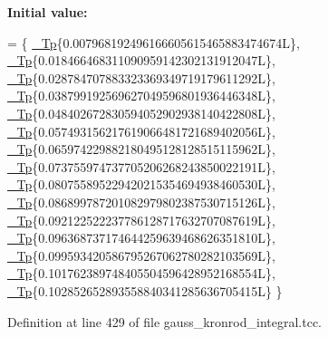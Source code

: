 {\bfseries Initial value\+:}
\begin{DoxyCode}
=
      \{
        \hyperlink{namespace____gnu__cxx_a3b19a9c800ca194374ef9172290f7d79}{\_Tp}\{0.007968192496166605615465883474674L\},
        \hyperlink{namespace____gnu__cxx_a3b19a9c800ca194374ef9172290f7d79}{\_Tp}\{0.018466468311090959142302131912047L\},
        \hyperlink{namespace____gnu__cxx_a3b19a9c800ca194374ef9172290f7d79}{\_Tp}\{0.028784707883323369349719179611292L\},
        \hyperlink{namespace____gnu__cxx_a3b19a9c800ca194374ef9172290f7d79}{\_Tp}\{0.038799192569627049596801936446348L\},
        \hyperlink{namespace____gnu__cxx_a3b19a9c800ca194374ef9172290f7d79}{\_Tp}\{0.048402672830594052902938140422808L\},
        \hyperlink{namespace____gnu__cxx_a3b19a9c800ca194374ef9172290f7d79}{\_Tp}\{0.057493156217619066481721689402056L\},
        \hyperlink{namespace____gnu__cxx_a3b19a9c800ca194374ef9172290f7d79}{\_Tp}\{0.065974229882180495128128515115962L\},
        \hyperlink{namespace____gnu__cxx_a3b19a9c800ca194374ef9172290f7d79}{\_Tp}\{0.073755974737705206268243850022191L\},
        \hyperlink{namespace____gnu__cxx_a3b19a9c800ca194374ef9172290f7d79}{\_Tp}\{0.080755895229420215354694938460530L\},
        \hyperlink{namespace____gnu__cxx_a3b19a9c800ca194374ef9172290f7d79}{\_Tp}\{0.086899787201082979802387530715126L\},
        \hyperlink{namespace____gnu__cxx_a3b19a9c800ca194374ef9172290f7d79}{\_Tp}\{0.092122522237786128717632707087619L\},
        \hyperlink{namespace____gnu__cxx_a3b19a9c800ca194374ef9172290f7d79}{\_Tp}\{0.096368737174644259639468626351810L\},
        \hyperlink{namespace____gnu__cxx_a3b19a9c800ca194374ef9172290f7d79}{\_Tp}\{0.099593420586795267062780282103569L\},
        \hyperlink{namespace____gnu__cxx_a3b19a9c800ca194374ef9172290f7d79}{\_Tp}\{0.101762389748405504596428952168554L\},
        \hyperlink{namespace____gnu__cxx_a3b19a9c800ca194374ef9172290f7d79}{\_Tp}\{0.102852652893558840341285636705415L\}
      \}
\end{DoxyCode}


Definition at line 429 of file gauss\+\_\+kronrod\+\_\+integral.\+tcc.

\mbox{\label{struct____gnu__cxx_1_1qk__integrator_3_01__Tp_00_01__FuncTp_00_01Kronrod__61_01_4_ac046047cb64928f79d4a76cb64b58da6}} 
